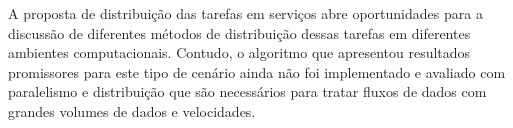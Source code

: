 
A proposta de distribuição das tarefas em serviços abre oportunidades para a
discussão de diferentes métodos de distribuição dessas tarefas em diferentes
ambientes computacionais.
Contudo, o algoritmo \minas que apresentou resultados promissores para este tipo de cenário ainda não foi implementado e avaliado com
paralelismo e distribuição que são necessários para tratar fluxos de dados com
grandes volumes de dados e velocidades.




